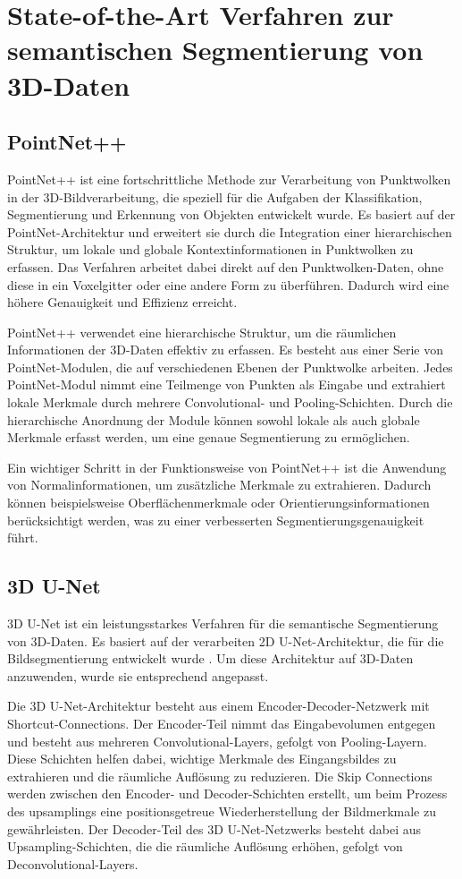 \chapter{State-of-the-Art Verfahren zur semantischen Segmentierung von 3D-Daten}
\section{PointNet++}
PointNet++ ist eine fortschrittliche Methode zur Verarbeitung von Punktwolken
in der 3D-Bildverarbeitung, die speziell für die Aufgaben der Klassifikation,
Segmentierung und Erkennung von Objekten entwickelt wurde. Es basiert auf der
PointNet-Architektur und erweitert sie durch die Integration einer
hierarchischen Struktur, um lokale und globale Kontextinformationen in
Punktwolken zu erfassen. Das Verfahren arbeitet dabei direkt auf den
Punktwolken-Daten, ohne diese in ein Voxelgitter oder eine andere Form zu
überführen. Dadurch wird eine höhere Genauigkeit und Effizienz erreicht.

PointNet++ verwendet eine hierarchische Struktur, um die räumlichen
Informationen der 3D-Daten effektiv zu erfassen. Es besteht aus einer Serie von
PointNet-Modulen, die auf verschiedenen Ebenen der Punktwolke arbeiten. Jedes
PointNet-Modul nimmt eine Teilmenge von Punkten als Eingabe und extrahiert
lokale Merkmale durch mehrere Convolutional- und Pooling-Schichten. Durch die
hierarchische Anordnung der Module können sowohl lokale als auch globale
Merkmale erfasst werden, um eine genaue Segmentierung zu ermöglichen.

Ein wichtiger Schritt in der Funktionsweise von PointNet++ ist die Anwendung
von Normalinformationen, um zusätzliche Merkmale zu extrahieren.
Dadurch können beispielsweise Oberflächenmerkmale oder
Orientierungsinformationen berücksichtigt werden, was zu einer verbesserten
Segmentierungsgenauigkeit führt. \cite{NIPS2017_d8bf84be} 

\section{3D U-Net}

3D U-Net ist ein leistungsstarkes Verfahren für die semantische Segmentierung von 3D-Daten.
Es basiert auf der verarbeiten 2D U-Net-Architektur, die für die Bildsegmentierung entwickelt wurde \cite{ronneberger2015unet}.
Um diese Architektur auf 3D-Daten anzuwenden, wurde sie entsprechend angepasst.

Die 3D U-Net-Architektur besteht aus einem Encoder-Decoder-Netzwerk mit
Shortcut-Connections. Der Encoder-Teil nimmt das Eingabevolumen entgegen und
besteht aus mehreren Convolutional-Layers, gefolgt von Pooling-Layern. Diese
Schichten helfen dabei, wichtige Merkmale des Eingangsbildes zu extrahieren und
die räumliche Auflösung zu reduzieren. Die Skip Connections werden zwischen den
Encoder- und Decoder-Schichten erstellt, um beim Prozess des upsamplings eine
positionsgetreue Wiederherstellung der Bildmerkmale zu gewährleisten. Der
Decoder-Teil des 3D U-Net-Netzwerks besteht dabei aus Upsampling-Schichten, die
die räumliche Auflösung erhöhen, gefolgt von Deconvolutional-Layers.

